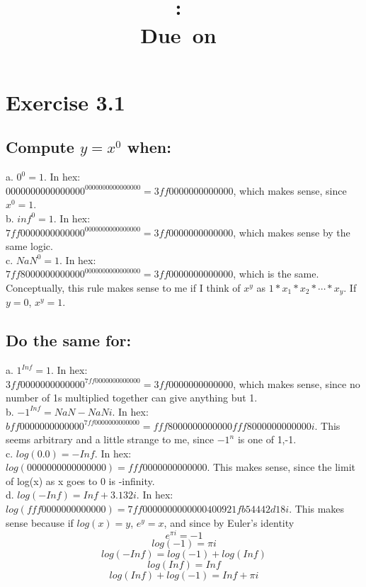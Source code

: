 \documentclass[11pt]{modart}
\title{\large{\hmwkAuthorName}\vspace{0.1in}\\\textmd{\textbf{\hmwkClass:\ \hmwkTitle}}\\\normalsize\vspace{0.1in}\small{Due\ on\ \hmwkDueDate}\\\vspace{0.1in}\large{\textit{\hmwkClassInstructor}}\vspace{0.5in}}
\author{}
\date{}
\begin{document}
\maketitle

\section{Exercise 3.1}
\subsection{Compute $y= x^0$ when:}
a. $0^0=1$.  In hex:\\
$0000000000000000^{0000000000000000} = 3ff0000000000000$, which makes sense, since $x^0 = 1$.\\
\newline
b. $inf^0 = 1$. In hex:\\
$7ff0000000000000^{0000000000000000} = 3ff0000000000000$, which makes sense by the same logic.\\
\newline
c. $NaN^0 = 1$. In hex:\\
$7ff8000000000000^{0000000000000000} = 3ff0000000000000$, which is the same.\\
\newline
Conceptually, this rule makes sense to me if I think of $x^y$ as $1*x_1*x_2*\cdots*x_{y}$.  If $y=0$, $x^y=1$.
\subsection{Do the same for:}
a. $1^{Inf}=1$.  In hex:\\
$3ff0000000000000^{7ff0000000000000} = 3ff0000000000000$,
 which makes sense, since no number of 1s multiplied together can give anything but 1.\\

b. $-1^{Inf}=NaN - NaNi$.  In hex:\\
$bff0000000000000^{7ff0000000000000} = fff8000000000000  fff8000000000000i$. 
 This seems arbitrary and a little strange to me, since $-1^n$ is one of {1,-1}.\\

c. $log(0.0)=-Inf$.  In hex:\\
$log(0000000000000000)=fff0000000000000$.  This makes sense, since the limit of log(x) as x goes to 0 is -infinity.\\

d. $log(-Inf)=Inf + 3.132i$.  In hex:\\
$log(fff0000000000000)=7ff0000000000000  400921fb54442d18i$.
This makes sense because if $log(x)=y$, $e^y = x$, and since by Euler's identity $$e^{\pi i}=-1$$ 
$$log(-1)=\pi i$$
$$log(-Inf)=log(-1) + log(Inf)$$
$$log(Inf)=Inf$$
$$log(Inf) + log(-1) = Inf + \pi i$$
\end{document}
